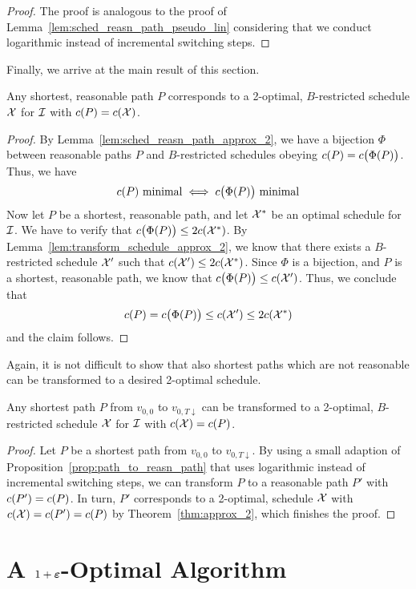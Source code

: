 \begin{proof}
The proof is analogous to the proof of Lemma~\ref{lem:sched_reasn_path_pseudo_lin} considering that we conduct logarithmic instead of incremental switching steps.
\end{proof}
Finally, we arrive at the main result of this section.
\begin{thm}\label{thm:approx_2}
Any shortest, reasonable path $P$ corresponds to a 2-optimal, $B$-restricted schedule $\mathcal{X}$ for $\mathcal{I}$ with $c(P)=c(\mathcal{X})$.
\end{thm} 
\begin{proof}
By Lemma~\ref{lem:sched_reasn_path_approx_2}, we have a bijection $\Phi$ between reasonable paths $P$ and $B$-restricted schedules obeying $c(P)=c\bigl(\Phi(P)\bigr)$. Thus, we have 
\begin{equation*}
	c(P)\text{ minimal}\iff c\bigl(\Phi(P)\big)\text{ minimal}
\end{equation*}
Now let $P$ be a shortest, reasonable path, and let $\mathcal{X}^*$ be an optimal schedule for $\mathcal{I}$. We have to verify that $c\bigl(\Phi(P)\bigr)\le 2c(\mathcal{X}^*)$. By Lemma~\ref{lem:transform_schedule_approx_2}, we know that there exists a $B$-restricted schedule $\mathcal{X}'$ such that $c(\mathcal{X}')\le 2c(\mathcal{X}^*)$. Since $\Phi$ is a bijection, and $P$ is a shortest, reasonable path, we know that $c\bigl(\Phi(P)\bigr)\le c(\mathcal{X}')$. Thus, we conclude that 
\begin{equation*}
	c(P)=c\bigl(\Phi(P)\bigr)\le c(\mathcal{X}')\le 2c(\mathcal{X}^*)
\end{equation*}
and the claim follows.
\end{proof}
Again, it is not difficult to show that also shortest paths which are not reasonable can be transformed to a desired 2-optimal schedule.
\begin{cor}\label{cor:opt_sched_short_path_pseudo_lin}
Any shortest path $P$ from $v_{0,0}$ to $v_{0,T\downarrow}$ can be transformed to a 2-optimal, $B$-restricted schedule $\mathcal{X}$ for $\mathcal{I}$ with $c(\mathcal{X})=c(P)$.
\end{cor}
\begin{proof}
Let $P$ be a shortest path from $v_{0,0}$ to $v_{0,T\downarrow}$. By using a small adaption of Proposition~\ref{prop:path_to_reasn_path} that uses logarithmic instead of incremental switching steps, we can transform $P$ to a reasonable path $P'$ with $c(P')=c(P)$.
In turn, $P'$ corresponds to a 2-optimal,  schedule $\mathcal{X}$ with $c(\mathcal{X})=c(P')=c(P)$ by Theorem~\ref{thm:approx_2}, which finishes the proof.
\end{proof}


\section{A $1+\boldsymbol\varepsilon$-Optimal Algorithm}
